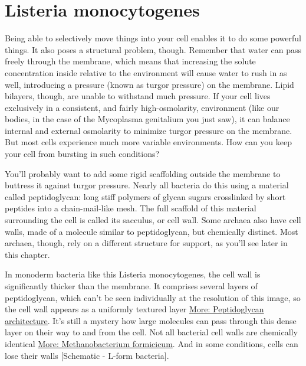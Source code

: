 \documentclass[]{tufte-book}
\begin{document}
\section{Listeria monocytogenes}\label{listeria-monocytogenes}

Being able to selectively move things into your cell enables it to do
some powerful things. It also poses a structural problem, though.
Remember that water can pass freely through the membrane, which means
that increasing the solute concentration inside relative to the
environment will cause water to rush in as well, introducing a pressure
(known as turgor pressure) on the membrane. Lipid bilayers, though, are
unable to withstand much pressure. If your cell lives exclusively in a
consistent, and fairly high-osmolarity, environment (like our bodies, in
the case of the Mycoplasma genitalium you just saw), it can balance
internal and external osmolarity to minimize turgor pressure on the
membrane. But most cells experience much more variable environments. How
can you keep your cell from bursting in such conditions?

You'll probably want to add some rigid scaffolding outside the membrane
to buttress it against turgor pressure. Nearly all bacteria do this
using a material called peptidoglycan: long stiff polymers of glycan
sugars crosslinked by short peptides into a chain-mail-like mesh. The
full scaffold of this material surrounding the cell is called its
sacculus, or cell wall. Some archaea also have cell walls, made of a
molecule similar to peptidoglycan, but chemically distinct. Most
archaea, though, rely on a different structure for support, as you'll
see later in this chapter.

In monoderm bacteria like this Listeria monocytogenes, the cell wall is
significantly thicker than the membrane. It comprises several layers of
peptidoglycan, which can't be seen individually at the resolution of
this image, so the cell wall appears as a uniformly textured layer
\protect\hyperlink{Peptidoglycan_architecture}{More: Peptidoglycan
architecture}. It's still a mystery how large molecules can pass through
this dense layer on their way to and from the cell. Not all bacterial
cell walls are chemically identical \protect\hyperlink{}{More:
Methanobacterium formicicum}. And in some conditions, cells can lose
their walls {[}Schematic - L-form bacteria{]}.
\end{document}
